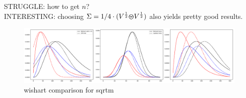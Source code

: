 STRUGGLE: how to get $n$?  \\
INTERESTING: choosing $\Sigma = 1/4 \cdot (V^{\frac{1}{2}} \ostimes V^{\frac{1}{2}}) $ also yields pretty good results.

\begin{figure}[!htb]
	\centering
	\includegraphics[width=\textwidth]{figures/wishart_sqrtm_bridge.pdf}
	\caption{wishart comparison for sqrtm}
	\label{fig:wishart_comparison}
\end{figure}





